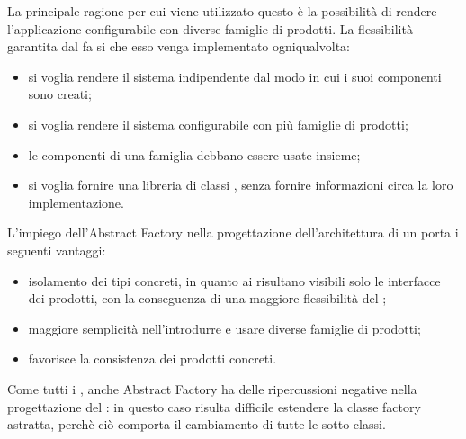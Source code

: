 La principale ragione per cui viene utilizzato questo  è la possibilità di rendere l'applicazione configurabile con diverse famiglie di prodotti. La flessibilità garantita dal  fa si che esso venga implementato ogniqualvolta:
\begin{itemize}
\item si voglia rendere il sistema indipendente dal modo in cui i suoi componenti sono creati;
\item si voglia rendere il sistema configurabile con più famiglie di prodotti;
\item le componenti di una famiglia debbano essere usate insieme;
\item si voglia fornire una libreria di classi , senza fornire informazioni circa la loro implementazione.
\end{itemize}
L'impiego dell'Abstract Factory nella progettazione dell'architettura di un   porta i seguenti vantaggi:
\begin{itemize}
\item isolamento dei tipi concreti, in quanto ai  risultano visibili solo le interfacce dei prodotti, con la conseguenza di una maggiore flessibilità del ;
\item maggiore semplicità nell'introdurre e usare diverse famiglie di prodotti;
\item favorisce la consistenza dei prodotti concreti.
\end{itemize}
Come tutti i , anche Abstract Factory ha delle ripercussioni negative nella progettazione del : in questo caso risulta difficile estendere la classe factory astratta, perchè ciò comporta il cambiamento di tutte le sotto classi.

